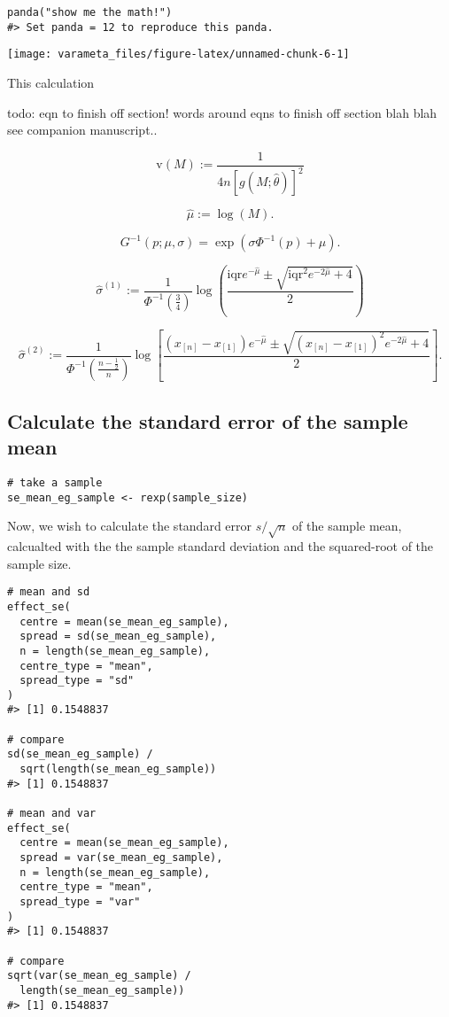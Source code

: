 \documentclass[
]{article}
\begin{document}
\begin{verbatim}
panda("show me the math!")
#> Set panda = 12 to reproduce this panda.
\end{verbatim}

\begin{center}\texttt{[image: varameta\_files/figure-latex/unnamed-chunk-6-1]} \end{center}

This calculation

todo: eqn to finish off section! words around eqns to finish off section
blah blah see companion manuscript..

\[
\mathrm v(M) := \frac 1 {4n\left[ g\left(M; \hat{\theta}\right)\right]^2}
\]

\[
\hat \mu := \log(M).
\]

\[
G^{-1}(p; \mu, \sigma) = \exp(\sigma\Phi^{-1}(p) + \mu).
\]

\[
\hat{\sigma}^{(1)} := \frac 1 {\Phi^{-1}\left(\frac 3 4\right)} \log\left(\frac {\mathrm{iqr} e^{- \hat \mu} \pm
\sqrt{\mathrm{iqr}^2 e^{-2 \hat \mu} + 4}
} {2}\right)
\]

\[
\hat{\sigma}^{(2)} := \frac 1 {\Phi^{-1}\left(\frac {n - \frac 1 2} n\right)} \log\left[\frac {(x_{[n]} - x_{[1]}) e^{- \hat \mu} \pm
\sqrt{(x_{[n]} - x_{[1]})^2 e^{-2\hat \mu} + 4}
} {2}\right].
\]

\hypertarget{calculate-the-standard-error-of-the-sample-mean}{%
\subsection{Calculate the standard error of the sample
mean}\label{calculate-the-standard-error-of-the-sample-mean}}

\begin{verbatim}
# take a sample
se_mean_eg_sample <- rexp(sample_size)
\end{verbatim}

Now, we wish to calculate the standard error \(s/\sqrt n\) of the sample
mean, calcualted with the the sample standard deviation and the
squared-root of the sample size.

\begin{verbatim}
# mean and sd
effect_se(
  centre = mean(se_mean_eg_sample),
  spread = sd(se_mean_eg_sample),
  n = length(se_mean_eg_sample),
  centre_type = "mean",
  spread_type = "sd"
)
#> [1] 0.1548837

# compare
sd(se_mean_eg_sample) /
  sqrt(length(se_mean_eg_sample))
#> [1] 0.1548837

# mean and var
effect_se(
  centre = mean(se_mean_eg_sample),
  spread = var(se_mean_eg_sample),
  n = length(se_mean_eg_sample),
  centre_type = "mean",
  spread_type = "var"
)
#> [1] 0.1548837

# compare
sqrt(var(se_mean_eg_sample) /
  length(se_mean_eg_sample))
#> [1] 0.1548837
\end{verbatim}
\end{document}
